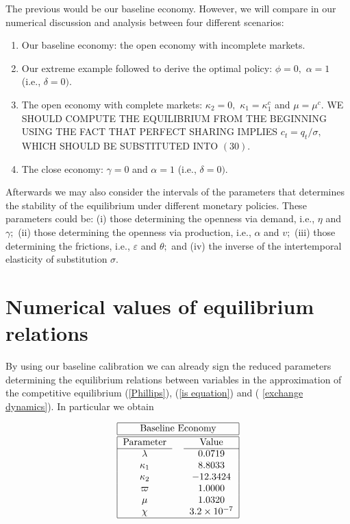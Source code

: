\documentclass{article}
\begin{document}
The previous would be our baseline economy. However, we will compare in our
numerical discussion and analysis between four different scenarios:

\begin{enumerate}
\item Our baseline economy: the open economy with incomplete markets.

\item Our extreme example followed to derive the optimal policy: $\phi =0,$ $%
\alpha =1$ (i.e., $\delta =0)$.

\item The open economy with complete markets: $\kappa _{2}=0,$ $\kappa
_{1}=\kappa _{1}^{c}$ and $\mu =\mu ^{c}.$ WE SHOULD COMPUTE THE EQUILIBRIUM
FROM THE BEGINNING USING THE FACT THAT PERFECT SHARING IMPLIES $%
c_{t}=q_{t}/\sigma ,$ WHICH SHOULD BE SUBSTITUTED INTO $(30).$

\item The close economy: $\gamma =0$ and $\alpha =1$ (i.e., $\delta =0).$
\end{enumerate}

Afterwards we may also consider the intervals of the parameters that
determines the stability of the equilibrium under different monetary
policies. These parameters could be: (i) those determining the openness via
demand, i.e., $\eta $ and $\gamma ;$ (ii) those determining the openness via
production, i.e., $\alpha $ and $v;$ (iii) those determining the frictions,
i.e., $\varepsilon $ and $\theta ;$ and (iv) the inverse of the
intertemporal elasticity of substitution $\sigma .$

\section{Numerical values of equilibrium relations}

By using our baseline calibration we can already sign the reduced parameters
determining the equilibrium relations between variables in the approximation
of the competitive equilibrium (\ref{Phillips}), (\ref{is equation}) and (%
\ref{exchange dynamics}). In particular we obtain

\begin{center}
\begin{equation*}
\begin{tabular}{|ccc|}
\hline
\multicolumn{3}{|c|}{Baseline Economy} \\ \hline\hline
Parameter &  & Value \\ \cline{1-1}\cline{3-3}
$\lambda $ &  & $0.0719$ \\ 
$\kappa _{1}$ &  & $8.8033$ \\ 
$\kappa _{2}$ &  & $-12.3424$ \\ 
$\varpi $ &  & $1.0000$ \\ 
$\mu $ &  & $1.0320$ \\ 
$\chi $ &  & $3.2\times 10^{-7}$ \\ \hline
\end{tabular}%
\end{equation*}
\end{center}
\end{document}
